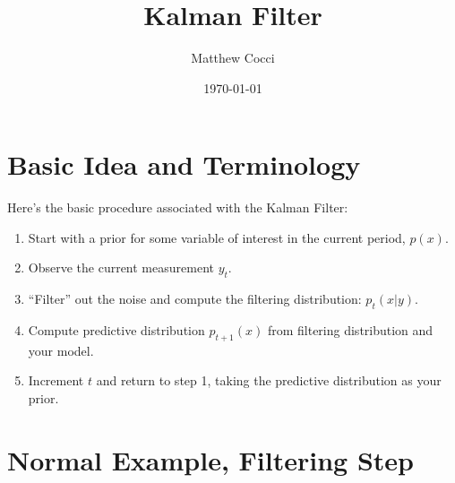 \documentclass[a4paper,12pt]{scrartcl}
\author{Matthew Cocci}
\title{Kalman Filter}
\date{\today}
\begin{document}
\maketitle


\section{Basic Idea and Terminology}

Here's the basic procedure associated with the Kalman
Filter:
\begin{enumerate}
    \item Start with a prior for some variable of interest
	in the current period, $p(x)$.
    \item Observe the current measurement $y_t$.
    \item ``Filter'' out the noise and 
	compute the filtering distribution: $p_t(x | y)$.
    \item Compute predictive distribution $p_{t+1}(x)$
	from  filtering distribution and your model.
    \item Increment $t$ and return to step 1, taking
	the predictive distribution as your prior.

\end{enumerate}

\section{Normal Example, Filtering Step}
\end{document}
